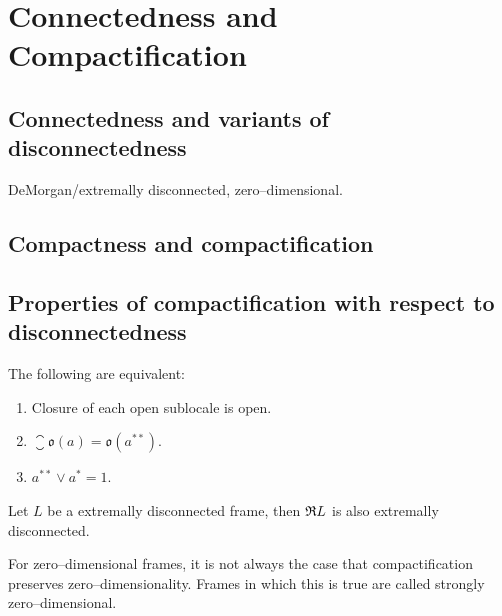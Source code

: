 \chapter{Connectedness and Compactification}
\section{Connectedness and variants of disconnectedness}
DeMorgan/extremally disconnected, zero--dimensional.
\section{Compactness and compactification}
\section{Properties of compactification with respect to disconnectedness}
\begin{lemma}
    The following are equivalent:

    \begin{enumerate}
        \item Closure of each open sublocale is open.
        \item $\closure{\mathfrak{o}(a)} = \mathfrak{o}(a^{**})$.
        \item $a^{**} \vee a^* = 1$.
    \end{enumerate}
\end{lemma}

\begin{proposition}\label{p:extrDiscPreserv}
    Let $L$ be a extremally disconnected frame, then $\mathfrak{R} L$ is also extremally disconnected.
\end{proposition}

\begin{remark}
    For zero--dimensional frames, it is not always the case that compactification preserves zero--dimensionality. Frames in which this is true are called strongly zero--dimensional.
\end{remark}


